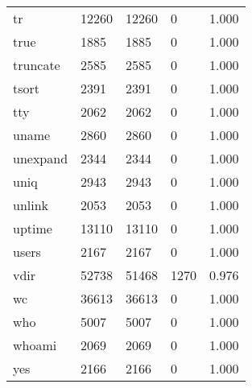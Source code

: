 \begin{longtable}{lp{4.5cm}p{4.5cm}p{4.5cm}p{4.5cm}}
tr        &                    12260 &        12260 &             0 &                    1.000 \\
true      &                     1885 &         1885 &             0 &                    1.000 \\
truncate  &                     2585 &         2585 &             0 &                    1.000 \\
tsort     &                     2391 &         2391 &             0 &                    1.000 \\
tty       &                     2062 &         2062 &             0 &                    1.000 \\
uname     &                     2860 &         2860 &             0 &                    1.000 \\
unexpand  &                     2344 &         2344 &             0 &                    1.000 \\
uniq      &                     2943 &         2943 &             0 &                    1.000 \\
unlink    &                     2053 &         2053 &             0 &                    1.000 \\
uptime    &                    13110 &        13110 &             0 &                    1.000 \\
users     &                     2167 &         2167 &             0 &                    1.000 \\
vdir      &                    52738 &        51468 &          1270 &                    0.976 \\
wc        &                    36613 &        36613 &             0 &                    1.000 \\
who       &                     5007 &         5007 &             0 &                    1.000 \\
whoami    &                     2069 &         2069 &             0 &                    1.000 \\
yes       &                     2166 &         2166 &             0 &                    1.000 \\
\end{longtable}

